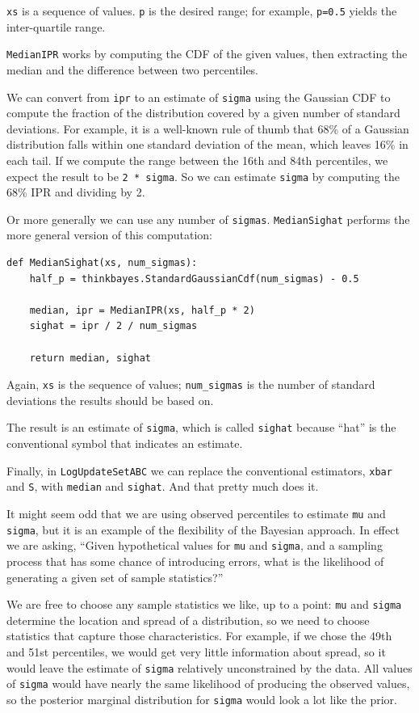 \documentclass[12pt]{book}
\begin{document}
{\tt xs} is a sequence of values.  {\tt p} is the desired range;
for example, {\tt p=0.5} yields the inter-quartile range.

{\tt MedianIPR} works by computing the CDF of the given values,
then extracting the median and the difference between two
percentiles.

We can convert from {\tt ipr} to an estimate of {\tt sigma} using the
Gaussian CDF to compute the fraction of the distribution covered by a
given number of standard deviations.  For example, it is a well-known
rule of thumb that 68\% of a Gaussian distribution falls within one
standard deviation of the mean, which leaves 16\% in each tail.  If we
compute the range between the 16th and 84th percentiles, we expect the
result to be {\tt 2 * sigma}.  So we can estimate {\tt sigma} by
computing the 68\% IPR and dividing by 2.

Or more generally we can use any number of {\tt sigmas}.
{\tt MedianSighat} performs the more general version of this
computation:

\begin{verbatim}
def MedianSighat(xs, num_sigmas):
    half_p = thinkbayes.StandardGaussianCdf(num_sigmas) - 0.5

    median, ipr = MedianIPR(xs, half_p * 2)
    sighat = ipr / 2 / num_sigmas

    return median, sighat
\end{verbatim}

Again, {\tt xs} is the sequence of values; \verb"num_sigmas" is
the number of standard deviations the results should be based on.

The result is an estimate of {\tt sigma}, which is called {\tt sighat}
because ``hat'' is the conventional symbol that indicates an
estimate.

Finally, in {\tt LogUpdateSetABC} we can replace the
conventional estimators, {\tt xbar} and {\tt S}, with {\tt median}
and {\tt sighat}.  And that pretty much does it.

It might seem odd that we are using observed percentiles to
estimate {\tt mu} and {\tt sigma}, but it is an example of the
flexibility of the Bayesian approach.  In effect we are asking,
``Given hypothetical values for {\tt mu} and {\tt sigma}, and
a sampling process that has some chance of introducing errors,
what is the likelihood of generating a given set of sample
statistics?''

We are free to choose any sample statistics we like, up to a point:
{\tt mu} and {\tt sigma} determine the location and spread of
a distribution, so we need to choose statistics that capture those
characteristics.  For example, if we chose the 49th and 51st percentiles,
we would get very little information about spread, so it
would leave the estimate of {\tt sigma} relatively unconstrained
by the data.  All values of {\tt sigma} would have nearly the
same likelihood of producing the observed values, so the posterior
marginal distribution for {\tt sigma} would look a lot like the
prior.
\end{document}
